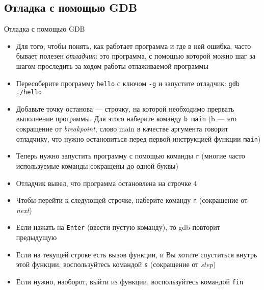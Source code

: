 \documentclass{beamer}
\begin{document}
\subsection{Отладка с помощью GDB}
\begin{frame}{Отладка с помощью GDB}
	\begin{itemize}
		\item{Для того, чтобы понять, как работает программа и где в ней ошибка, часто бывает полезен \emph{отладчик}: это программа, с помощью которой можно шаг за шагом проследить за ходом работы отлаживаемой программы}\pause
		\item{Пересоберите программу \texttt{hello} с ключом \texttt{-g} и запустите отладчик: \texttt{gdb ./hello}}\pause
		\item{Добавьте точку останова --- строчку, на которой необходимо прервать выполнение программы. Для этого наберите команду \texttt{b main} (b --- это сокращение от \emph{breakpoint}, слово main в качестве аргумента говорит отладчику, что нужно остановиться перед первой инструкцией функции \texttt{main})}
	\end{itemize}
\end{frame}

\begin{frame}
	\begin{itemize}
		\item{Теперь нужно запустить программу с помощью команды \texttt{r} (многие часто используемые команды сокращены до одной буквы)}\pause
		\item{Отладчик вывел, что программа остановлена на строчке 4}\pause
		\item{Чтобы перейти к следующей строчке, наберите команду \texttt{n} (сокращение от \emph{next})}\pause
		\item{Если нажать на \texttt{Enter} (ввести пустую команду), то gdb повторит предыдущую}\pause
		\item{Если на текущей строке есть вызов функции, и Вы хотите спуститься внутрь этой функции, воспользуйтесь командой \texttt{s} (сокращение от \emph{step})}\pause
		\item{Если нужно, наоборот, выйти из функции, воспользуйтесь командой \texttt{fin}}
	\end{itemize}
\end{frame}
\end{document}
